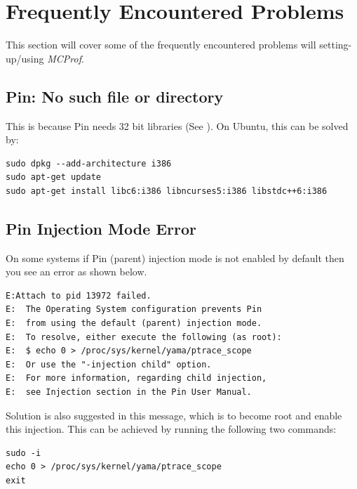 \documentclass[10pt]{article}
\newcommand{\MCPROF}{\emph{MCProf}}
\begin{document}
\section{Frequently Encountered Problems}
\label{sec:faq}

This section will cover some of the frequently encountered problems will
setting-up/using \MCPROF{}.

\subsection{Pin: No such file or directory}
This is because Pin needs 32 bit libraries (See \cite{PinLibs32}).
On Ubuntu, this can be solved by:
{
\small
\begin{Verbatim}[frame=single, samepage=true]
sudo dpkg --add-architecture i386
sudo apt-get update
sudo apt-get install libc6:i386 libncurses5:i386 libstdc++6:i386
\end{Verbatim}
}


\subsection{Pin Injection Mode Error}

On some systems if Pin (parent) injection mode is not enabled by default then
you see an error as shown below.

{
\small
\begin{Verbatim}[frame=single, samepage=true]
E:Attach to pid 13972 failed. 
E:  The Operating System configuration prevents Pin
E:  from using the default (parent) injection mode.
E:  To resolve, either execute the following (as root):
E:  $ echo 0 > /proc/sys/kernel/yama/ptrace_scope
E:  Or use the "-injection child" option.
E:  For more information, regarding child injection,
E:  see Injection section in the Pin User Manual.
\end{Verbatim}
}

Solution is also suggested in this message, which is to become root and enable
this injection. This can be achieved by running the following two commands:

{
\small
\begin{Verbatim}[frame=single, samepage=true]
sudo -i
echo 0 > /proc/sys/kernel/yama/ptrace_scope
exit
\end{Verbatim}
}


\end{document}

